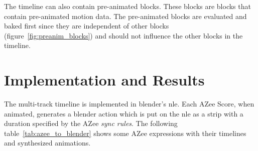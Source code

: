 \documentclass[../../main.tex]{subfiles}
\begin{document}

The timeline can also contain pre-animated blocks. These blocks are blocks that contain pre-animated motion data. The pre-animated blocks are evaluated and baked first since they are independent of other blocks (figure~\ref{fig:preanim_blocks}) and should not influence the other blocks in the timeline.

\section{Implementation and Results}
\label{ch:multi_track:implem_results}

The multi-track timeline is implemented in blender's \gls{nle}. Each AZee Score, when animated, generates a blender action which is put on the \gls{nle} as a strip with a duration specified by the AZee \emph{sync rules}. The following table~\ref{tab:azee_to_blender} shows some AZee expressions with their timelines and synthesized animations.
\end{document}
